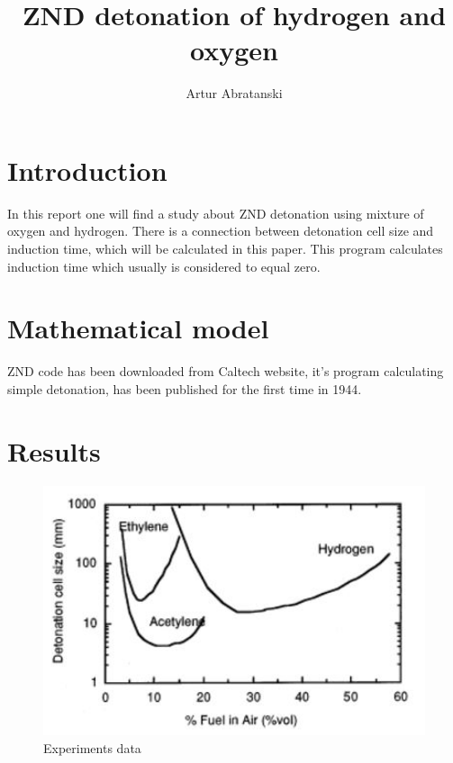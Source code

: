 \documentclass[a4paper]{article}
\title{ZND detonation of hydrogen and oxygen}
\author{Artur Abratanski}
\begin{document}
\maketitle


\section{Introduction}\label{sec:intro}
In this report one will find a study about ZND detonation using mixture of oxygen and hydrogen. There is a connection between detonation cell size and induction time, which will be calculated in this paper. This program calculates induction time which usually is considered to equal zero.  
\section{Mathematical model}\label{sec:model}
ZND code has been downloaded from Caltech website, it's program calculating simple detonation, has been published for the first time in 1944. 

\section{Results}\label{sec:results}

\begin{figure}[H]
\includegraphics[width=1\textwidth]{cellsize.JPG}
\caption{\label{fig:cj}Experiments data}
\end{figure}
\end{document}

